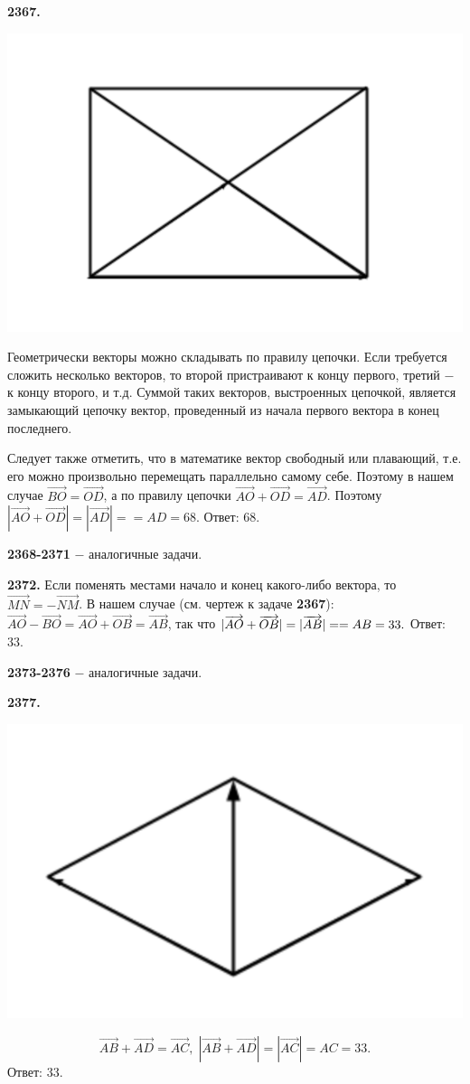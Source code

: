 \textbf{2367.}

{\centering \includegraphics[width=0.5\linewidth]{Geometry/Content/56.png}
	
}

Геометрически векторы можно складывать по правилу цепочки. Если требуется сложить несколько векторов, то второй пристраивают к концу первого, третий $-$ к концу второго, и т.д. Суммой таких векторов, выстроенных цепочкой, является замыкающий цепочку вектор, проведенный из начала первого вектора в конец последнего. 

Следует также отметить, что в математике вектор свободный или плавающий, т.е. его можно произвольно перемещать параллельно самому себе. Поэтому в нашем случае $\overrightarrow{BO}=\overrightarrow{OD}$, а по правилу цепочки $\overrightarrow{AO}+\overrightarrow{OD}=\overrightarrow{AD}$. Поэтому $|\overrightarrow{AO}+\overrightarrow{OD}|=|\overrightarrow{AD}|=$\newline$=AD=68.$ \newline \null \hspace*{\fill} Ответ: 68.

\textbf{2368-2371} $-$ аналогичные задачи. 

\textbf{2372.} Если поменять местами начало и конец какого-либо вектора, то $\overrightarrow{MN}=-\overrightarrow{NM}$. В нашем случае (см. чертеж к задаче \textbf{2367}): $\overrightarrow{AO} - \overrightarrow{BO} = \overrightarrow{AO} + \overrightarrow{OB} = \overrightarrow{AB}$, так что $|\overrightarrow{AO}+\overrightarrow{OB}|=|\overrightarrow{AB}|=\linebreak=AB=33.$ \newline \null \hspace*{\fill} Ответ: 33.

\textbf{2373-2376} $-$ аналогичные задачи.

\textbf{2377.}

{\centering \includegraphics[width=0.5\linewidth]{Geometry/Content/57.png}
	
}
\[
\overrightarrow{AB}+\overrightarrow{AD}=\overrightarrow{AC}, \; |\overrightarrow{AB} + \overrightarrow{AD}| = |\overrightarrow{AC}|=AC=33.
\] \newline \null \hspace*{\fill} Ответ: 33.

